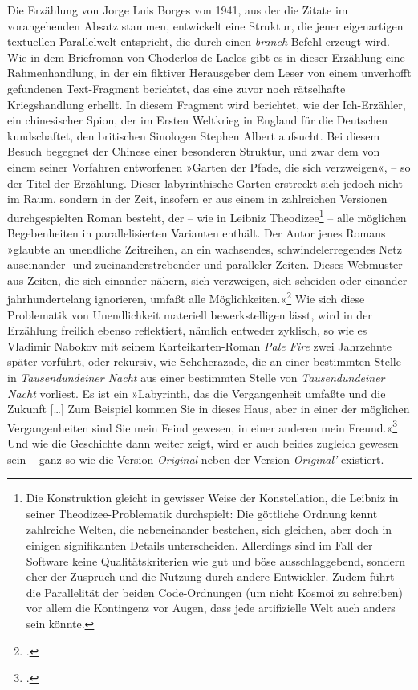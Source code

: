 \documentclass[a4paper,10pt]{article}
\newcommand{\anf}[1]{»#1«}
\begin{document}
Die Erzählung von Jorge Luis Borges von 1941, aus der die Zitate im vorangehenden Absatz stammen, entwickelt eine Struktur, die jener eigenartigen textuellen Parallelwelt entspricht, die durch einen \emph{branch}-Befehl erzeugt wird. Wie in dem Briefroman von Choderlos de Laclos gibt es in dieser Erzählung eine Rahmenhandlung, in der ein fiktiver Herausgeber dem Leser von einem unverhofft gefundenen Text-Fragment berichtet, das eine zuvor noch rätselhafte Kriegshandlung erhellt. In diesem Fragment wird berichtet, wie der Ich-Erzähler, ein chinesischer Spion, der im Ersten Weltkrieg in England für die Deutschen kundschaftet, den britischen Sinologen Stephen Albert aufsucht. Bei diesem Besuch begegnet der Chinese einer besonderen Struktur, und zwar dem von einem seiner Vorfahren entworfenen \anf{Garten der Pfade, die sich verzweigen}, – so der Titel der Erzählung. Dieser labyrinthische Garten erstreckt sich jedoch nicht im Raum, sondern in der Zeit, insofern er aus einem in zahlreichen Versionen durchgespielten Roman besteht, der – wie in Leibniz Theodizee\footnote{Die Konstruktion gleicht in gewisser Weise der Konstellation, die Leibniz in seiner Theodizee-Problematik durchspielt: Die göttliche Ordnung kennt zahlreiche Welten, die nebeneinander bestehen, sich gleichen, aber doch in einigen signifikanten Details unterscheiden. Allerdings sind im Fall der Software keine Qualitätskriterien wie gut und böse ausschlaggebend, sondern eher der Zuspruch und die Nutzung durch andere Entwickler. Zudem führt die Parallelität der beiden Code-Ordnungen (um nicht Kosmoi zu schreiben) vor allem die Kontingenz vor Augen, dass jede artifizielle Welt auch anders sein könnte.} – alle möglichen Begebenheiten in parallelisierten Varianten enthält. Der Autor jenes Romans \anf{glaubte an unendliche Zeitreihen, an ein wachsendes, schwindelerregendes Netz auseinander- und zueinanderstrebender und paralleler Zeiten. Dieses Webmuster aus Zeiten, die sich einander nähern, sich verzweigen, sich scheiden oder einander jahrhundertelang ignorieren, umfaßt alle Möglichkeiten.}\footcite[172]{borges:1941} Wie sich diese Problematik von Unendlichkeit materiell bewerkstelligen lässt, wird in der Erzählung freilich ebenso reflektiert, nämlich entweder zyklisch, so wie es Vladimir Nabokov mit seinem Karteikarten-Roman \emph{Pale Fire} zwei Jahrzehnte später vorführt, oder rekursiv, wie Scheherazade, die an einer bestimmten Stelle in \emph{Tausendundeiner Nacht} aus einer bestimmten Stelle von \emph{Tausendundeiner Nacht} vorliest. Es ist ein \anf{Labyrinth, das die Vergangenheit umfaßte und die Zukunft [\ldots] Zum Beispiel kommen Sie in dieses Haus, aber in einer der möglichen Vergangenheiten sind Sie mein Feind gewesen, in einer anderen mein Freund.}\footcite[166/170]{borges:1941} Und wie die Geschichte dann weiter zeigt, wird er auch beides zugleich gewesen sein – ganz so wie die Version \emph{Original} neben der Version \emph{Original'} existiert. %
\end{document}
